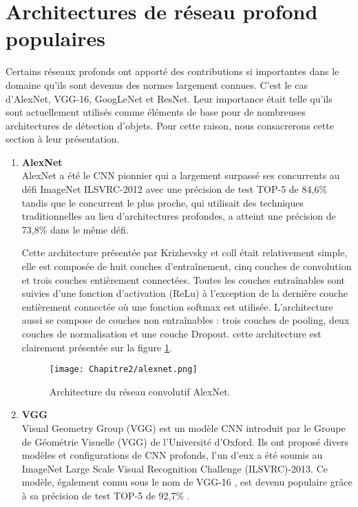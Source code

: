\section{Architectures de réseau profond populaires} 
Certains réseaux profonds ont apporté des contributions si importantes dans le domaine qu'ils sont devenus des normes largement connues. C'est le cas d'AlexNet, VGG-16, GoogLeNet et ResNet. Leur importance était telle qu'ils sont actuellement utilisés comme éléments de base pour de nombreuses architectures de détection d'objets. Pour cette raison, nous consacrerons cette section à leur présentation. 

\begin{enumerate}
\item \textbf{AlexNet}\cite{alexnet}\\
AlexNet a été le  CNN pionnier qui a largement surpassé ses concurrents au défi ImageNet ILSVRC-2012 avec une précision de test TOP-5 de 84,6\% tandis que le concurrent le plus proche, qui utilisait des techniques traditionnelles au lieu d'architectures profondes, a atteint une précision de 73,8\% dans le même défi. 

Cette architecture présentée par Krizhevsky et coll était relativement simple, elle est composée de huit couches d'entraînement, cinq couches de convolution et trois couches entièrement connectées. Toutes les couches entraînables sont suivies d'une fonction d'activation (ReLu) à l'exception de la dernière couche entièrement connectée où une fonction softmax est utilisée. L'architecture aussi se compose de couches non entraînables : trois couches de pooling, deux couches de normalisation et une couche Dropout. cette architecture est clairement présentée sur la figure \ref{alexnet}.

\begin{figure}[H]
\centering
\texttt{[image: Chapitre2/alexnet.png]}
\caption{Architecture du réseau convolutif AlexNet. \cite{alexnet}}
\label{alexnet}
\end{figure}
 
\item \textbf{VGG}\cite{vgg}\\
Visual Geometry Group (VGG) est un modèle CNN introduit par le Groupe de Géométrie Visuelle (VGG) de l'Université d'Oxford. Ils ont proposé divers modèles et configurations de CNN profonds, l'un d'eux a été soumis au ImageNet Large Scale Visual Recognition Challenge (ILSVRC)-2013. Ce modèle, également connu sous le nom de VGG-16 , est devenu populaire grâce à sa précision  de test TOP-5 de 92,7\% . 


\end{enumerate}

